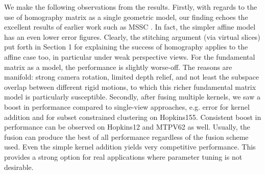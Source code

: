 \documentclass[10pt,twocolumn,letterpaper]{article}
\begin{document}
We make the following observations from the results. Firstly, with regards to the use of homography matrix as a single geometric model, our finding echoes the excellent results of earlier work such as MSSC \cite{Lai2017}. In fact, the simpler affine model has an even lower error figures. Clearly, the stitching argument (via virtual slices) put forth in Section 1 for explaining the success of homography applies to the affine case too, in particular under weak perspective views. For the fundamental matrix as a model, the performance is slightly worse-off. The reasons are manifold: strong camera rotation, limited depth relief, and not least the subspace overlap between different rigid motions, to which this richer fundamental matrix model is particularly susceptible. 
Secondly, after fusing multiple kernels, we saw a boost in performance compared to single-view approaches, e.g.  error for kernel addition and  for subset constrained clustering on Hopkins155. Consistent boost in performance can be observed on Hopkins12 and MTPV62 as well. Usually, the fusion can produce the best of all performance regardless of the fusion scheme used. Even the simple kernel addition yields very competitive performance. This provides a strong option for real applications where parameter tuning is not desirable. 
\end{document}
